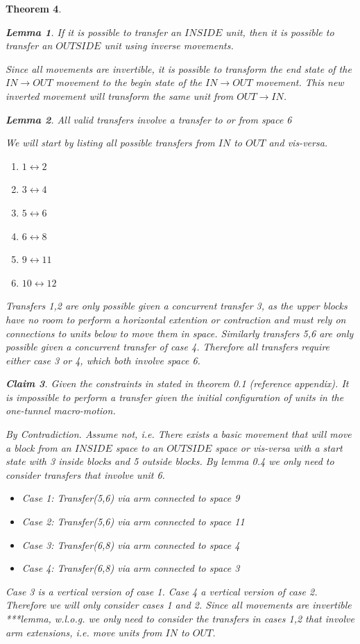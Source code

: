 \documentclass[12pt]{article}
\newtheorem{theorem}{Theorem}[section]
\newtheorem{claim}[theorem]{Claim}
\newtheorem{lemma}[theorem]{Lemma}
\newenvironment{proof}[1][Proof]{\begin{trivlist}
\item[\hskip \labelsep {\bfseries #1}]}{\end{trivlist}}
\begin{document}
\begin{theorem}
\begin{lemma} If it is possible to transfer an $INSIDE$ unit, then it is possible to transfer an $OUTSIDE$ unit using inverse movements.
\end{lemma}
\begin{proof}
Since all movements are invertible, it is possible to transform the end state of the $IN \rightarrow OUT$ movement to the begin state of the $IN \rightarrow OUT$ movement. This new inverted movement will transform the same unit from $OUT \rightarrow IN$.
\end{proof}
\begin{lemma} All valid transfers involve a transfer to or from space 6
\end{lemma}
\begin{proof}
We will start by listing all possible transfers from $IN$ to $OUT$ and vis-versa.
\begin{enumerate}
\item $1 \leftrightarrow 2$
\item $3 \leftrightarrow 4$
\item $5 \leftrightarrow 6$
\item $6 \leftrightarrow 8$
\item $9 \leftrightarrow 11$
\item $10 \leftrightarrow 12$
\end{enumerate}
Transfers 1,2 are only possible given a concurrent transfer 3, as the upper blocks have no room to perform a horizontal extention or contraction and must rely on connections to units below to move them in space. Similarly transfers 5,6 are only possible given a concurrent transfer of case 4. Therefore all transfers require either case 3 or 4, which both involve space 6.
\end{proof}
\begin{claim} Given the constraints in stated in theorem 0.1 (reference appendix). It is impossible to perform a transfer given the initial configuration of units in the one-tunnel macro-motion.

By Contradiction. Assume not, i.e. There exists a basic movement that will move a block from an $INSIDE$ space to an $OUTSIDE$ space or vis-versa with a start state with 3 inside blocks and 5 outside blocks. By lemma 0.4 we only need to consider transfers that involve unit 6. 
\begin{itemize}
\item Case 1: Transfer(5,6) via arm connected to space 9
\item Case 2: Transfer(5,6) via arm connected to space 11
\item Case 3: Transfer(6,8) via arm connected to space 4
\item Case 4: Transfer(6,8) via arm connected to space 3
\end{itemize}
Case 3 is a vertical version of case 1. Case 4 a vertical version of case 2. Therefore we will only consider cases 1 and 2. Since all movements are invertible ***lemma, w.l.o.g. we only need to consider the transfers in cases 1,2 that involve arm extensions, i.e. move units from $IN$ to $OUT$.


\end{claim}
\end{theorem}
\end{document}
